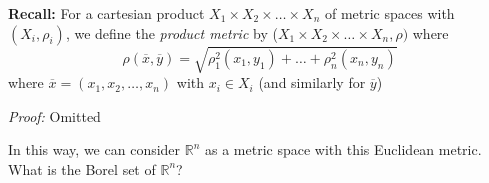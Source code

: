 \documentclass[12pt]{report}
\newcommand{\R}{\mathbb{R}}
\renewcommand{\bar}[1]{\overline{#1}}
\newenvironment*{tbox}[2][gray]{
    \begin{tcolorbox}[
        parbox=false,
        colback=#1!5!white,
        colframe=#1!75!black,
        breakable,
        title={#2}
    ]}
    {\end{tcolorbox}}
\begin{document}
    \textbf{Recall:} For a cartesian product $X_1 \times X_2 \times \dots \times X_n$ of metric spaces with $(X_i, \rho_i)$, we define the \emph{product metric} by ($X_1 \times X_2 \times \dots \times X_n, \rho)$ where 
    \[\rho(\bar x, \bar y) = \sqrt{\rho_1^2(x_1, y_1) + \dots + \rho_n^2(x_n, y_n)}\]
    where $\bar x = (x_1, x_2, \dots, x_n)$ with $x_i \in X_i$ (and similarly for $\bar y$)

    \begin{tbox}{\textbf{Proposition:} 
        \[\lim_{m \to \infty} \rho(\bar x, \bar y) = 0 \iff \lim_{m \to \infty} \rho_i(x_i^m, y_i^m) = 0\]}
        \emph{Proof:} Omitted
    \end{tbox}

    In this way, we can consider $\R^n$ as a metric space with this Euclidean metric. What is the Borel set of $\R^n$?
\end{document}
